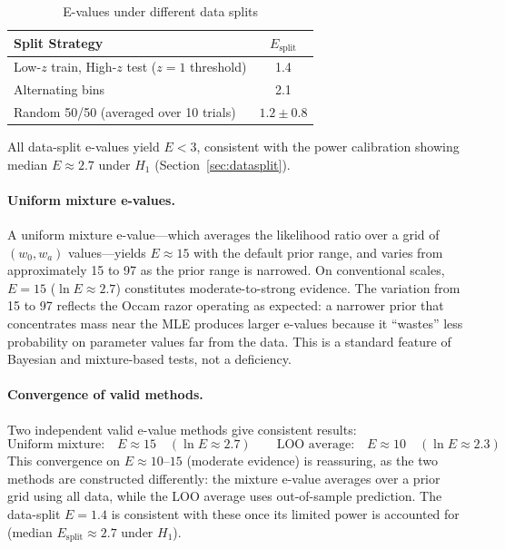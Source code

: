 \documentclass[11pt,a4paper]{article}
\begin{document}
\begin{table}[H]
\centering
\caption{E-values under different data splits}
\label{tab:splits}
\begin{tabular}{@{}lc@{}}
\toprule
Split Strategy & $E_{\text{split}}$ \\
\midrule
Low-$z$ train, High-$z$ test ($z = 1$ threshold) & 1.4 \\
Alternating bins & 2.1 \\
Random 50/50 (averaged over 10 trials) & $1.2 \pm 0.8$ \\
\bottomrule
\end{tabular}
\end{table}

All data-split e-values yield $E < 3$, consistent with the power calibration showing median $E \approx 2.7$ under $H_1$ (Section~\ref{sec:datasplit}).

\paragraph{Uniform mixture e-values.} A uniform mixture e-value---which averages the likelihood ratio over a grid of $(w_0, w_a)$ values---yields $E \approx 15$ with the default prior range, and varies from approximately 15 to 97 as the prior range is narrowed. On conventional scales, $E = 15$ ($\ln E \approx 2.7$) constitutes moderate-to-strong evidence. The variation from 15 to 97 reflects the Occam razor operating as expected: a narrower prior that concentrates mass near the MLE produces larger e-values because it ``wastes'' less probability on parameter values far from the data. This is a standard feature of Bayesian and mixture-based tests, not a deficiency.

\paragraph{Convergence of valid methods.} Two independent valid e-value methods give consistent results:
\begin{equation}
\text{Uniform mixture:} \quad E \approx 15 \quad (\ln E \approx 2.7) \qquad \text{LOO average:} \quad E \approx 10 \quad (\ln E \approx 2.3)
\end{equation}
This convergence on $E \approx 10$--$15$ (moderate evidence) is reassuring, as the two methods are constructed differently: the mixture e-value averages over a prior grid using all data, while the LOO average uses out-of-sample prediction. The data-split $E = 1.4$ is consistent with these once its limited power is accounted for (median $E_{\text{split}} \approx 2.7$ under $H_1$).
\end{document}
